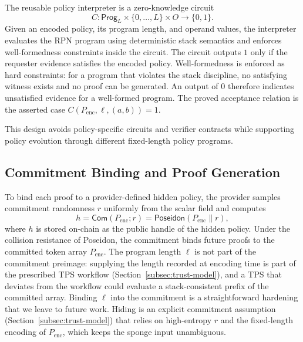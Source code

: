 The reusable policy interpreter is a zero-knowledge circuit
\begin{equation}
	C : \mathsf{Prog}_{L}\times \{0,\ldots,L\} \times O \rightarrow \{0,1\}.
\end{equation}
Given an encoded policy, its program length, and operand values, the interpreter evaluates the
RPN program using deterministic stack semantics and enforces well-formedness constraints inside the circuit.
The circuit outputs $1$ only if the requester evidence satisfies the encoded policy.
Well-formedness is enforced as hard constraints: for a program that violates the stack discipline, no satisfying witness exists and no proof can be generated.
An output of $0$ therefore indicates unsatisfied evidence for a well-formed program. The proved acceptance relation is the asserted case $C(P_{\mathrm{enc}},\ell,(a,b))=1$.

This design avoids policy-specific circuits and verifier contracts while supporting policy evolution through different fixed-length policy programs.

\subsection{Commitment Binding and Proof Generation}

To bind each proof to a provider-defined hidden policy, the provider samples commitment randomness $r$ uniformly from the scalar field and computes
\begin{equation}
	h = \mathsf{Com}(P_{\mathrm{enc}}; r) = \mathsf{Poseidon}(P_{\mathrm{enc}}\parallel r),
\end{equation}
where $h$ is stored on-chain as the public handle of the hidden policy.
Under the collision resistance of Poseidon, the commitment binds future proofs to the committed
token array $P_{\mathrm{enc}}$.
The program length $\ell$ is not part of the commitment preimage: supplying the length recorded at encoding time is part of the prescribed TPS workflow (Section~\ref{subsec:trust-model}), and a TPS that deviates from the workflow could evaluate a stack-consistent prefix of the committed array.
Binding $\ell$ into the commitment is a straightforward hardening that we leave to future work.
Hiding is an explicit commitment assumption (Section~\ref{subsec:trust-model}) that relies on
high-entropy $r$ and the fixed-length encoding of $P_{\mathrm{enc}}$, which keeps the sponge input unambiguous.

